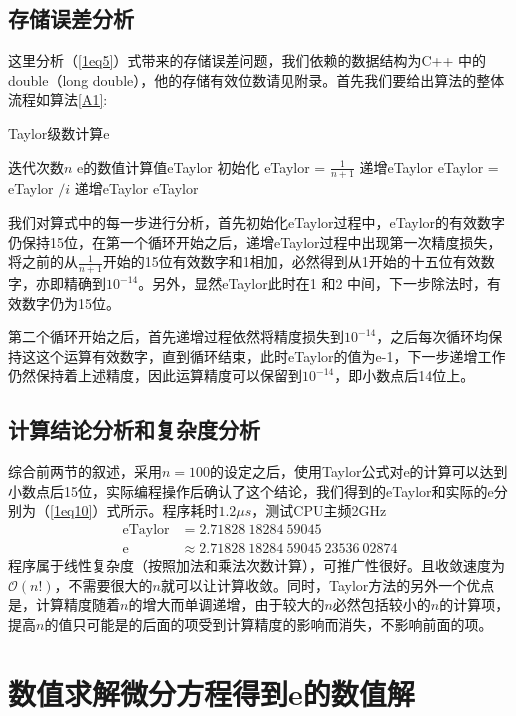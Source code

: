 \documentclass[onecolumn,compsoc]{IEEEtran}
\renewcommand{\|}{\Bigg |}
\newcommand{\e}{\mathrm{e}}
\begin{document}
\subsection{存储误差分析}
这里分析（\ref{1eq5}）式带来的存储误差问题，我们依赖的数据结构为C++ 中的double（long double），他的存储有效位数请见附录。首先我们要给出算法的整体流程如算法\ref{A1}:
\begin{algorithm}[h]\caption{Taylor级数计算e}\label{A1}
\begin{algorithmic}
\Require 迭代次数$n$
\Ensure e的数值计算值eTaylor
\State 初始化 eTaylor = $\frac{1}{n+1}$
\State 递增eTaylor
\State eTaylor = eTaylor $/i$
\EndFor
\State 递增eTaylor
\State \Return eTaylor
\end{algorithmic}\end{algorithm}
我们对算式中的每一步进行分析，首先初始化eTaylor过程中，eTaylor的有效数字仍保持15位，在第一个循环开始之后，递增eTaylor过程中出现第一次精度损失，将之前的从$\frac{1}{n+1}$开始的15位有效数字和1相加，必然得到从1开始的十五位有效数字，亦即精确到$10^{-14}$。另外，显然eTaylor此时在1 和2 中间，下一步除法时，有效数字仍为15位。

第二个循环开始之后，首先递增过程依然将精度损失到$10^{-14}$，之后每次循环均保持这这个运算有效数字，直到循环结束，此时eTaylor的值为e-1，下一步递增工作仍然保持着上述精度，因此运算精度可以保留到$10^{-14}$，即小数点后14位上。
\subsection{计算结论分析和复杂度分析}
综合前两节的叙述，采用$n = 100$的设定之后，使用Taylor公式对e的计算可以达到小数点后15位，实际编程操作后确认了这个结论，我们得到的eTaylor和实际的e分别为（\ref{1eq10}）式所示。程序耗时$1.2\mu s$，测试CPU主频2GHz
\begin{equation}\label{1eq10}\begin{aligned}
\mathrm{eTaylor} &= 2.71828\ 18284\ 59045 \\ 
\e &\approx 2.71828\ 18284\ 59045\ 23536\ 02874 
\end{aligned}\end{equation}
程序属于线性复杂度（按照加法和乘法次数计算），可推广性很好。且收敛速度为$\mathcal{O}(n!)$，不需要很大的$n$就可以让计算收敛。同时，Taylor方法的另外一个优点是，计算精度随着$n$的增大而单调递增，由于较大的$n$必然包括较小的$n$的计算项，提高$n$的值只可能是的后面的项受到计算精度的影响而消失，不影响前面的项。
\section{数值求解微分方程得到e的数值解}
\end{document}

